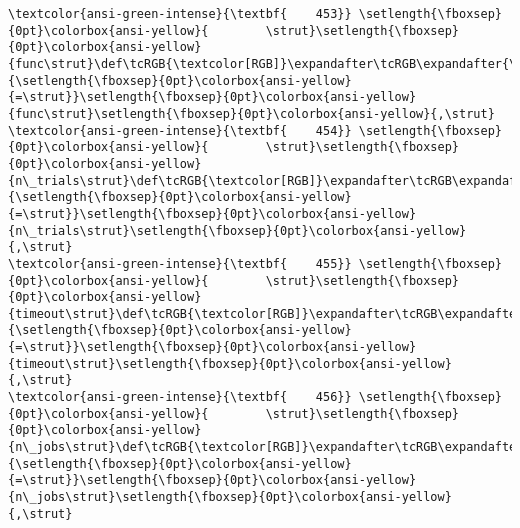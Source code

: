 \documentclass[11pt]{article}
\begin{document}
\begin{Verbatim}[commandchars=\\\{\}, frame=single, framerule=2mm, rulecolor=\color{outerrorbackground}]
\textcolor{ansi-green-intense}{\textbf{    453}} \setlength{\fboxsep}{0pt}\colorbox{ansi-yellow}{        \strut}\setlength{\fboxsep}{0pt}\colorbox{ansi-yellow}{func\strut}\def\tcRGB{\textcolor[RGB]}\expandafter\tcRGB\expandafter{\detokenize{98,98,98}}{\setlength{\fboxsep}{0pt}\colorbox{ansi-yellow}{=\strut}}\setlength{\fboxsep}{0pt}\colorbox{ansi-yellow}{func\strut}\setlength{\fboxsep}{0pt}\colorbox{ansi-yellow}{,\strut}
\textcolor{ansi-green-intense}{\textbf{    454}} \setlength{\fboxsep}{0pt}\colorbox{ansi-yellow}{        \strut}\setlength{\fboxsep}{0pt}\colorbox{ansi-yellow}{n\_trials\strut}\def\tcRGB{\textcolor[RGB]}\expandafter\tcRGB\expandafter{\detokenize{98,98,98}}{\setlength{\fboxsep}{0pt}\colorbox{ansi-yellow}{=\strut}}\setlength{\fboxsep}{0pt}\colorbox{ansi-yellow}{n\_trials\strut}\setlength{\fboxsep}{0pt}\colorbox{ansi-yellow}{,\strut}
\textcolor{ansi-green-intense}{\textbf{    455}} \setlength{\fboxsep}{0pt}\colorbox{ansi-yellow}{        \strut}\setlength{\fboxsep}{0pt}\colorbox{ansi-yellow}{timeout\strut}\def\tcRGB{\textcolor[RGB]}\expandafter\tcRGB\expandafter{\detokenize{98,98,98}}{\setlength{\fboxsep}{0pt}\colorbox{ansi-yellow}{=\strut}}\setlength{\fboxsep}{0pt}\colorbox{ansi-yellow}{timeout\strut}\setlength{\fboxsep}{0pt}\colorbox{ansi-yellow}{,\strut}
\textcolor{ansi-green-intense}{\textbf{    456}} \setlength{\fboxsep}{0pt}\colorbox{ansi-yellow}{        \strut}\setlength{\fboxsep}{0pt}\colorbox{ansi-yellow}{n\_jobs\strut}\def\tcRGB{\textcolor[RGB]}\expandafter\tcRGB\expandafter{\detokenize{98,98,98}}{\setlength{\fboxsep}{0pt}\colorbox{ansi-yellow}{=\strut}}\setlength{\fboxsep}{0pt}\colorbox{ansi-yellow}{n\_jobs\strut}\setlength{\fboxsep}{0pt}\colorbox{ansi-yellow}{,\strut}

\end{Verbatim}
\end{document}
